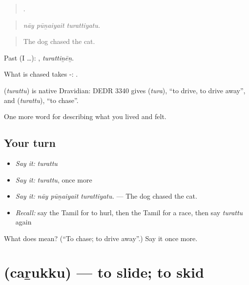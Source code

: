 \begin{quote}
  .
\end{quote}

\begin{quote}
\emph{nāy pūṉaiyait turattiyatu.}
\end{quote}

\begin{quote}
The dog chased the cat.
\end{quote}

Past (I …): , \emph{turattiṉēṉ}.

What is chased takes -:  .

\begin{cousinweb}
\textbf{} (\emph{turattu}) is native Dravidian: DEDR 3340 gives  (\emph{tura}), \textquotedblleft{}to drive, to drive away\textquotedblright{}, and  (\emph{turattu}), \textquotedblleft{}to chase\textquotedblright{}.
\end{cousinweb}

\begin{grammarlens}[title={What you've built}]
One more word for describing what you lived and felt.
\end{grammarlens}

\subsection*{Your turn}
\begin{itemize}
\raggedright
  \item \emph{Say it:} \emph{turattu}
  \item \emph{Say it:} \emph{turattu}, once more
  \item \emph{Say it:} \emph{nāy pūṉaiyait turattiyatu.} — The dog chased the cat.
  \item \emph{Recall:} say the Tamil for to hurl, then the Tamil for a race, then say \emph{turattu} again
\end{itemize}

\begin{tcolorbox}[breakable,colback=teal!4,colframe=teal!35!black,title={Before you move on}]
What does  mean? (\textquotedblleft{}To chase; to drive away\textquotedblright{}.) Say it once more.
\end{tcolorbox}
\section[\texorpdfstring{\ta{சறுக்கு} (caṟukku)}{சறுக்கு (caṟukku)}]{ (caṟukku) — to slide; to skid}

